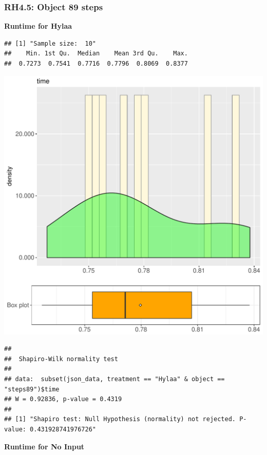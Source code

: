 \documentclass{article}\usepackage[]{graphicx}\usepackage[]{color}
\makeatletter
\def\maxwidth{ %
  \ifdim\Gin@nat@width>\linewidth
    \linewidth
  \else
    \Gin@nat@width
  \fi
}
\newenvironment{kframe}{%
 \def\at@end@of@kframe{}%
 \ifinner\ifhmode%
  \def\at@end@of@kframe{\end{minipage}}%
  \begin{minipage}{\columnwidth}%
 \fi\fi%
 \def\FrameCommand##1{\hskip\@totalleftmargin \hskip-\fboxsep
 \colorbox{shadecolor}{##1}\hskip-\fboxsep
     \hskip-\linewidth \hskip-\@totalleftmargin \hskip\columnwidth}%
 \MakeFramed {\advance\hsize-\width
   \@totalleftmargin\z@ \linewidth\hsize
   \@setminipage}}%
 {\par\unskip\endMakeFramed%
 \at@end@of@kframe}
\newenvironment{knitrout}{}{} %
\makeatother
\begin{document}
\subsubsection{RH4.5: Object 89 steps}

 \textbf{Runtime for Hylaa}
\begin{knitrout}
\color{fgcolor}\begin{kframe}
\begin{verbatim}
## [1] "Sample size:  10"
##    Min. 1st Qu.  Median    Mean 3rd Qu.    Max. 
##  0.7273  0.7541  0.7716  0.7796  0.8069  0.8377
\end{verbatim}
\end{kframe}
\includegraphics[width=\maxwidth]{figure/RH4_Hylaa_steps89-1} 
\begin{kframe}\begin{verbatim}
## 
## 	Shapiro-Wilk normality test
## 
## data:  subset(json_data, treatment == "Hylaa" & object == "steps89")$time
## W = 0.92836, p-value = 0.4319
## 
## [1] "Shapiro test: Null Hypothesis (normality) not rejected. P-value: 0.431928741976726"
\end{verbatim}
\end{kframe}
\end{knitrout}
 \textbf{Runtime for No Input}
\end{document}

